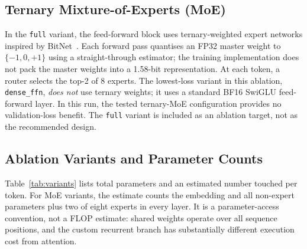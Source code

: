 \documentclass[conference]{IEEEtran}
\begin{document}
\subsection{Ternary Mixture-of-Experts (MoE)}

In the \texttt{full} variant, the feed-forward block uses ternary-weighted
expert networks inspired by BitNet~\cite{bitnet2025}. Each forward pass
quantises an FP32 master weight to $\{-1,0,+1\}$ using a straight-through
estimator; the training implementation does not pack the master weights into a
1.58-bit representation. At each token, a router selects the top-2 of 8
experts. The lowest-loss variant in this ablation,
\texttt{dense\_ffn}, \emph{does not} use ternary weights; it uses a standard
BF16 SwiGLU feed-forward layer. In this run, the tested ternary-MoE
configuration provides no validation-loss benefit. The \texttt{full}
variant is included as an ablation target, not as the recommended design.

\subsection{Ablation Variants and Parameter Counts}

Table~\ref{tab:variants} lists total parameters and an estimated number touched
per token. For MoE variants, the estimate counts the embedding and all
non-expert parameters plus two of eight experts in every layer. It is a
parameter-access convention, not a FLOP estimate: shared weights operate over
all sequence positions, and the custom recurrent branch has substantially
different execution cost from attention.

\begin{table}[!t]
\centering
\caption{Architectural variants ($d_\text{model}=800$, $d_\text{ff}=1{,}600$,
         12~layers, 8 experts, top-$k=2$). Total = all stored weights;
         Active = weights touched per forward token pass.}
\label{tab:variants}
\end{table}
\end{document}
